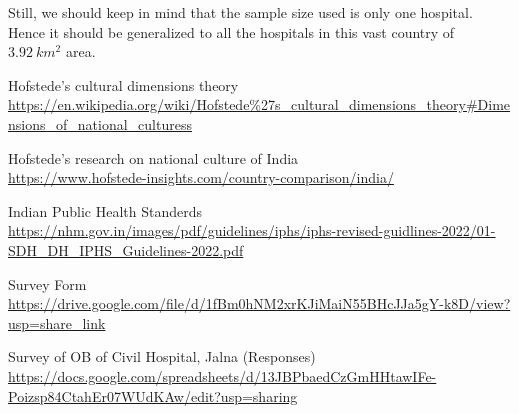 \documentclass{article}
\begin{document}
Still, we should keep in mind that the sample size used is only one hospital. Hence it should be generalized to all the hospitals in this vast country of $3.92\ km^2$ area.

\newpage
\begin{thebibliography}{99}

    {Hofstede's cultural dimensions theory\\
    \url{https://en.wikipedia.org/wiki/Hofstede%27s_cultural_dimensions_theory#Dimensions_of_national_culturess}}


    {Hofstede's research on national culture of India\\
    \url{https://www.hofstede-insights.com/country-comparison/india/}}

    {Indian Public Health Standerds\\
    \url{https://nhm.gov.in/images/pdf/guidelines/iphs/iphs-revised-guidlines-2022/01-SDH_DH_IPHS_Guidelines-2022.pdf}}

    {Survey Form\\
    \url{https://drive.google.com/file/d/1fBm0hNM2xrKJiMaiN55BHcJJa5gY-k8D/view?usp=share_link}}

    {Survey of OB of Civil Hospital, Jalna (Responses)\\
    \url{https://docs.google.com/spreadsheets/d/13JBPbaedCzGmHHtawIFe-Poizsp84CtahEr07WUdKAw/edit?usp=sharing}}

\end{thebibliography}
\end{document}
